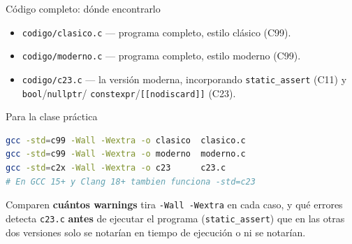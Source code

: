 \documentclass[aspectratio=169]{beamer}
\begin{document}
\begin{frame}[fragile]{Código completo: dónde encontrarlo}
    \begin{itemize}
        \item \texttt{codigo/clasico.c} \quad — programa completo, estilo clásico (C99).
        \item \texttt{codigo/moderno.c} \quad — programa completo, estilo moderno (C99).
        \item \texttt{codigo/c23.c} \quad — la versión moderna, incorporando
              \texttt{static\_assert} (C11) y \texttt{bool}/\texttt{nullptr}/
              \texttt{constexpr}/\texttt{[[nodiscard]]} (C23).
    \end{itemize}

    \vspace{1em}
    \begin{block}{Para la clase práctica}
        \begin{lstlisting}[language=bash]
gcc -std=c99 -Wall -Wextra -o clasico  clasico.c
gcc -std=c99 -Wall -Wextra -o moderno  moderno.c
gcc -std=c2x -Wall -Wextra -o c23      c23.c
# En GCC 15+ y Clang 18+ tambien funciona -std=c23
        \end{lstlisting}
        Comparen \textbf{cuántos warnings} tira \texttt{-Wall -Wextra} en
        cada caso, y qué errores detecta \texttt{c23.c} \textbf{antes} de
        ejecutar el programa (\texttt{static\_assert}) que en las otras dos
        versiones solo se notarían en tiempo de ejecución o ni se notarían.
    \end{block}
\end{frame}
\end{document}
